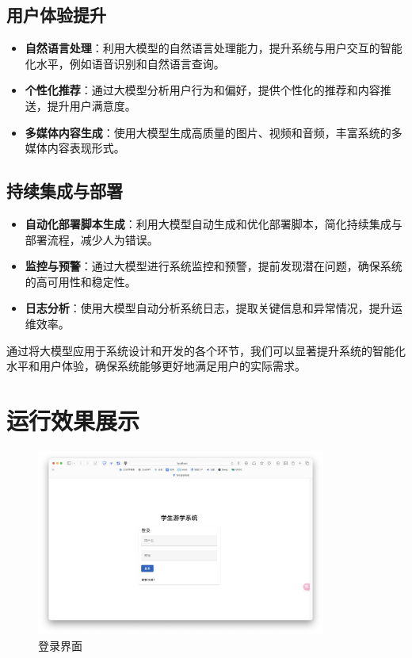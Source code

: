 \documentclass{ctexart}
\begin{document}
\subsection{用户体验提升}

\begin{itemize}
    \item \textbf{自然语言处理}：利用大模型的自然语言处理能力，提升系统与用户交互的智能化水平，例如语音识别和自然语言查询。
    \item \textbf{个性化推荐}：通过大模型分析用户行为和偏好，提供个性化的推荐和内容推送，提升用户满意度。
    \item \textbf{多媒体内容生成}：使用大模型生成高质量的图片、视频和音频，丰富系统的多媒体内容表现形式。
\end{itemize}

\subsection{持续集成与部署}

\begin{itemize}
    \item \textbf{自动化部署脚本生成}：利用大模型自动生成和优化部署脚本，简化持续集成与部署流程，减少人为错误。
    \item \textbf{监控与预警}：通过大模型进行系统监控和预警，提前发现潜在问题，确保系统的高可用性和稳定性。
    \item \textbf{日志分析}：使用大模型自动分析系统日志，提取关键信息和异常情况，提升运维效率。
\end{itemize}

通过将大模型应用于系统设计和开发的各个环节，我们可以显著提升系统的智能化水平和用户体验，确保系统能够更好地满足用户的实际需求。

\section{运行效果展示}

\begin{figure}[htbp]
    \centering
    \includegraphics[width=0.85\textwidth]{figure/login.png}
    \caption{登录界面}
\end{figure}
\end{document}
